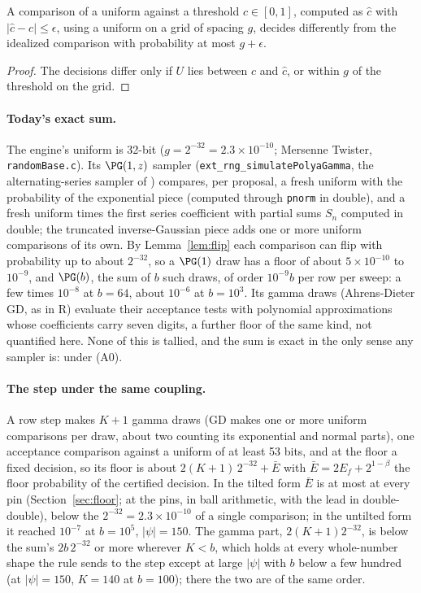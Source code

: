 \begin{lemma}\label{lem:flip}
A comparison of a uniform against a threshold $c\in[0,1]$, computed as $\hat c$ with $|\hat c-c|\le\epsilon$,
using a uniform on a grid of spacing $g$, decides differently from the idealized comparison with probability at
most $g+\epsilon$.
\end{lemma}
\begin{proof}
The decisions differ only if $U$ lies between $c$ and $\hat c$, or within $g$ of the threshold on the grid.
\end{proof}

\paragraph{Today's exact sum.} The engine's uniform is 32-bit ($g=2^{-32}=2.3\times10^{-10}$; Mersenne Twister,
\texttt{randomBase.c}). Its $\PG(1,z)$ sampler (\texttt{ext\_rng\_simulatePolyaGamma}, the alternating-series
sampler of \cite[Sec.~4.1]{psw}) compares, per proposal, a fresh uniform with the probability of the exponential
piece (computed through \texttt{pnorm} in double), and a fresh uniform times the first series coefficient with
partial sums $S_n$ computed in double; the truncated inverse-Gaussian piece adds one or more uniform comparisons
of its own. By Lemma~\ref{lem:flip} each comparison can flip with probability up to about $2^{-32}$, so a
$\PG(1)$ draw has a floor of about $5\times10^{-10}$ to $10^{-9}$, and $\PG(b)$, the sum of $b$ such draws, of
order $10^{-9}b$ per row per sweep: a few times $10^{-8}$ at $b=64$, about $10^{-6}$ at $b=10^3$. Its gamma draws
(Ahrens-Dieter GD, as in R) evaluate their acceptance tests with polynomial approximations whose coefficients
carry seven digits, a further floor of the same kind, not quantified here. None of this is tallied, and the sum
is exact in the only sense any sampler is: under (A0).

\paragraph{The step under the same coupling.} A row step makes $K+1$ gamma draws (GD makes one or more
uniform comparisons per draw, about two counting its exponential and normal parts), one acceptance comparison
against a uniform of at least 53 bits, and at the floor a fixed decision, so its floor is about
$2(K+1)\,2^{-32}+\bar E$ with $\bar E=2E_f+2^{1-\beta}$ the floor probability of the certified decision. In the
tilted form $\bar E$ is at most \FLOORSTEP{} at every pin
(Section~\ref{sec:floor}; at the pins, in ball arithmetic, with the lead in double-double), below the
$2^{-32}=2.3\times10^{-10}$ of a single comparison; in the untilted form it
reached $10^{-7}$ at $b=10^5$, $|\psi|=150$. The gamma part, $2(K+1)2^{-32}$, is below the sum's $2b\,2^{-32}$ or
more wherever $K<b$, which holds at every whole-number shape the rule sends to the step except at large $|\psi|$
with $b$ below a few hundred (at $|\psi|=150$, $K=140$ at $b=100$); there the two are of the same order.

